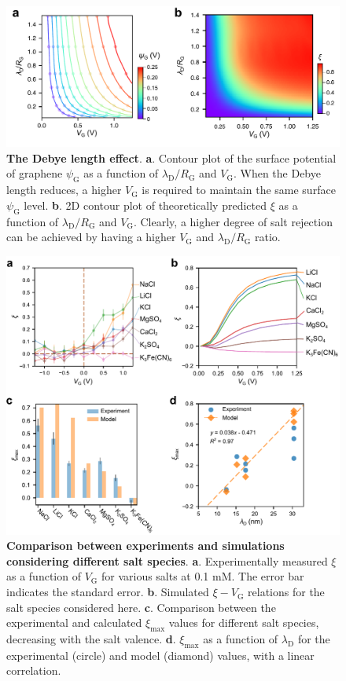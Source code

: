 \documentclass[journal=langd5,email=true, hyperref=true, keywords=false]{achemso}
\begin{document}
\begin{figure}[htbp]
  \centering
  \includegraphics[width=0.95\linewidth]{img/fig5.pdf}
  \caption{\textbf{The Debye length effect}. \textbf{a}. Contour plot
    of the surface potential of graphene $\psi_{\mathrm{G}}$ as a
    function of $\lambda_{\mathrm{D}}/R_{\mathrm{G}}$ and
    $V_{\mathrm{G}}$. When the Debye length reduces, a higher
    $V_{\mathrm{G}}$ is required to maintain the same surface
    $\psi_{\mathrm{G}}$ level. \textbf{b}. 2D contour plot of
    theoretically predicted $\xi$ as a function of
    $\lambda_{\mathrm{D}}/R_{\mathrm{G}}$ and
    $V_{\mathrm{G}}$. Clearly, a higher degree of salt rejection can
    be achieved by having a higher $V_{\mathrm{G}}$ and
    $\lambda_{\mathrm{D}}/R_{\mathrm{G}}$ ratio.}
  \label{fig:5}
\end{figure}

\begin{figure}[htbp]
  \centering
  \includegraphics[width=0.95\linewidth]{img/fig6.pdf}
  \caption{\textbf{Comparison between experiments and simulations
      considering different salt species}. \textbf{a}. Experimentally
    measured $\xi$ as a function of $V_{\mathrm{G}}$ for various salts
    at 0.1 mM. The error bar indicates the standard
    error. \textbf{b}. Simulated $\xi-V_{\mathrm{G}}$ relations for
    the salt species considered here. \textbf{c}. Comparison between
    the experimental and calculated $\xi_{\mathrm{max}}$ values for
    different salt species, decreasing with the salt
    valence. \textbf{d}. $\xi_{\mathrm{max}}$ as a function of
    $\lambda_{\mathrm{D}}$ for the experimental (circle) and model
    (diamond) values, with a linear correlation.}
  \label{fig:6}
\end{figure}
\end{document}
